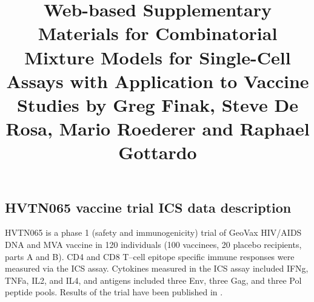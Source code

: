 \documentclass{article}
\title{Web-based Supplementary Materials for Combinatorial Mixture Models for Single-Cell Assays with Application to Vaccine Studies by Greg Finak, Steve De Rosa, Mario Roederer and Raphael Gottardo}
\date{}
\begin{document}
\maketitle
\appendix
\renewcommand{\thesubsection}{Web Appendix \Alph{subsection}:}
\setcounter{subsection}{0}
\renewcommand{\figurename}{\textbf{Web Figure}}
\renewcommand{\thefigure}{\textbf{\Alph{figure}}}
\setcounter{figure}{0}

\section*{}
\subsection{HVTN065 vaccine trial ICS data description}
\label{supp:statpublished}
HVTN065 is a phase 1 (safety and immunogenicity) trial of GeoVax HIV/AIDS DNA and MVA vaccine in 120 individuals (100 vaccinees, 20 placebo recipients, parts A and B). CD4 and CD8 T--cell epitope specific immune responses were measured via the ICS assay. 
Cytokines measured in the ICS assay included IFNg, TNFa, IL2, and IL4, and antigens included three Env, three Gag, and three Pol peptide pools. Results of the trial have been published in \cite{Goepfert:2011ci}.

\end{document}
